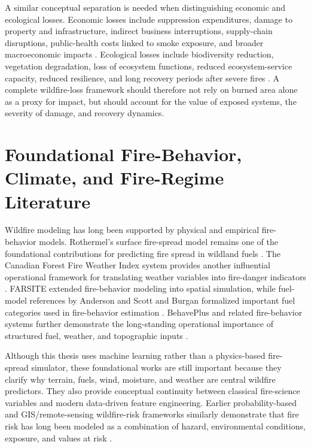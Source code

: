 A similar conceptual separation is needed when distinguishing economic and ecological losses. Economic losses include suppression expenditures, damage to property and infrastructure, indirect business interruptions, supply-chain disruptions, public-health costs linked to smoke exposure, and broader macroeconomic impacts \citep{huang2024suppression,wang2021economicfootprint,monge2023probabilistic,law2025anthropogenic,qiu2025wildfiresmoke}. Ecological losses include biodiversity reduction, vegetation degradation, loss of ecosystem functions, reduced ecosystem-service capacity, reduced resilience, and long recovery periods after severe fires \citep{arrogantefunes2024ecological,rocesdiaz2022ecosystemservices,pacheco2023ecosystemservices,taboada2021ecosystemdelivery}. A complete wildfire-loss framework should therefore not rely on burned area alone as a proxy for impact, but should account for the value of exposed systems, the severity of damage, and recovery dynamics.

\section{Foundational Fire-Behavior, Climate, and Fire-Regime Literature}

Wildfire modeling has long been supported by physical and empirical fire-behavior models. Rothermel's surface fire-spread model remains one of the foundational contributions for predicting fire spread in wildland fuels \citep{rothermel1972spread}. The Canadian Forest Fire Weather Index system provides another influential operational framework for translating weather variables into fire-danger indicators \citep{vanwagner1987fwi}. FARSITE extended fire-behavior modeling into spatial simulation, while fuel-model references by Anderson and Scott and Burgan formalized important fuel categories used in fire-behavior estimation \citep{finney1998farsite,anderson1982fuelmodels,scott2005fuelmodels}. BehavePlus and related fire-behavior systems further demonstrate the long-standing operational importance of structured fuel, weather, and topographic inputs \citep{andrews2014behaveplus}.

Although this thesis uses machine learning rather than a physics-based fire-spread simulator, these foundational works are still important because they clarify why terrain, fuels, wind, moisture, and weather are central wildfire predictors. They also provide conceptual continuity between classical fire-science variables and modern data-driven feature engineering. Earlier probability-based and GIS/remote-sensing wildfire-risk frameworks similarly demonstrate that fire risk has long been modeled as a combination of hazard, environmental conditions, exposure, and values at risk \citep{preisler2004forecasting,chuvieco2010framework,ager2010wildfire,thompson2011risk}.

